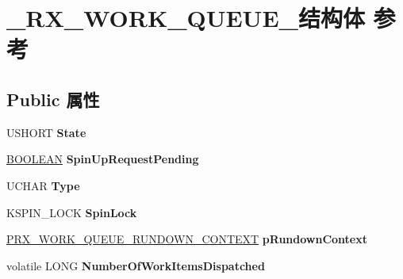 \hypertarget{struct___r_x___w_o_r_k___q_u_e_u_e__}{}\section{\+\_\+\+R\+X\+\_\+\+W\+O\+R\+K\+\_\+\+Q\+U\+E\+U\+E\+\_\+结构体 参考}
\label{struct___r_x___w_o_r_k___q_u_e_u_e__}
\subsection*{Public 属性}
\begin{DoxyCompactItemize}
\item 
\mbox{\label{struct___r_x___w_o_r_k___q_u_e_u_e___a7b5752de5c42614155684edaa7b5947f}} 
U\+S\+H\+O\+RT {\bfseries State}
\item 
\mbox{\label{struct___r_x___w_o_r_k___q_u_e_u_e___a6ca72a598754c503f5e713e8a8f0d967}} 
\hyperlink{_processor_bind_8h_a112e3146cb38b6ee95e64d85842e380a}{B\+O\+O\+L\+E\+AN} {\bfseries Spin\+Up\+Request\+Pending}
\item 
\mbox{\label{struct___r_x___w_o_r_k___q_u_e_u_e___ae0b398a4e0fef2129e4202b24baff93b}} 
U\+C\+H\+AR {\bfseries Type}
\item 
\mbox{\label{struct___r_x___w_o_r_k___q_u_e_u_e___a09ccd57d3b6c5e9755c73b13f4e3b91a}} 
K\+S\+P\+I\+N\+\_\+\+L\+O\+CK {\bfseries Spin\+Lock}
\item 
\mbox{\label{struct___r_x___w_o_r_k___q_u_e_u_e___aa76404e8aeb55007d22bf5d2004af9a9}} 
\hyperlink{struct___r_x___w_o_r_k___q_u_e_u_e___r_u_n_d_o_w_n___c_o_n_t_e_x_t__}{P\+R\+X\+\_\+\+W\+O\+R\+K\+\_\+\+Q\+U\+E\+U\+E\+\_\+\+R\+U\+N\+D\+O\+W\+N\+\_\+\+C\+O\+N\+T\+E\+XT} {\bfseries p\+Rundown\+Context}
\item 
\mbox{\label{struct___r_x___w_o_r_k___q_u_e_u_e___a19c3e3c1776dbae393448f9aae73e105}} 
volatile L\+O\+NG {\bfseries Number\+Of\+Work\+Items\+Dispatched}
\item 
\mbox{\label{struct___r_x___w_o_r_k___q_u_e_u_e___ab7b52ba5ed6003d2056c790a35af057a}} 

\end{DoxyCompactItemize}
